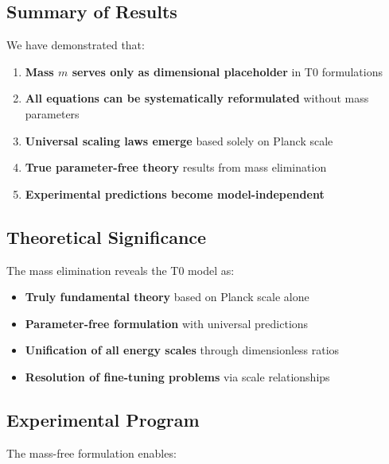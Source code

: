 \documentclass[12pt,a4paper]{article}
\begin{document}
	\subsection{Summary of Results}
	\label{subsec:summary}
	
	We have demonstrated that:
	
	\begin{enumerate}
		\item \textbf{Mass $m$ serves only as dimensional placeholder} in T0 formulations
		\item \textbf{All equations can be systematically reformulated} without mass parameters
		\item \textbf{Universal scaling laws emerge} based solely on Planck scale
		\item \textbf{True parameter-free theory} results from mass elimination
		\item \textbf{Experimental predictions become model-independent}
	\end{enumerate}
	
	\subsection{Theoretical Significance}
	\label{subsec:theoretical_significance}
	
	The mass elimination reveals the T0 model as:
	
	\begin{tcolorbox}[colback=green!5!white,colframe=green!75!black,title=T0 Model: True Nature]
		\begin{itemize}
			\item \textbf{Truly fundamental theory} based on Planck scale alone
			\item \textbf{Parameter-free formulation} with universal predictions
			\item \textbf{Unification of all energy scales} through dimensionless ratios
			\item \textbf{Resolution of fine-tuning problems} via scale relationships
		\end{itemize}
	\end{tcolorbox}
	
	\subsection{Experimental Program}
	\label{subsec:experimental_program}
	
	The mass-free formulation enables:
	
\end{document}
